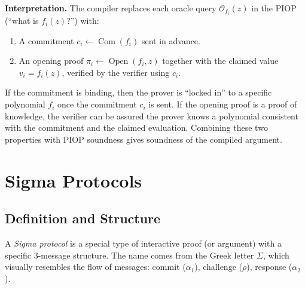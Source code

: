 \documentclass[11pt]{article}
\theoremstyle{plain}
\theoremstyle{definition}
\DeclareMathOperator{\Com}{Com}
\DeclareMathOperator{\Open}{Open}
\begin{document}
\medskip
\noindent\textbf{Interpretation.}  The compiler replaces each oracle query
$\mathcal{O}_{f_i}(z)$ in the PIOP (``what is $f_i(z)$?'') with:
\begin{enumerate}
  \item A commitment $c_i \leftarrow \Com(f_i)$ sent in advance.
  \item An opening proof $\pi_i \leftarrow \Open(f_i, z)$ together with the claimed value
    $v_i = f_i(z)$, verified by the verifier using $c_i$.
\end{enumerate}
If the commitment is binding, then the prover is ``locked in'' to a specific polynomial
$f_i$ once the commitment $c_i$ is sent.  If the opening proof is a proof of knowledge,
the verifier can be assured the prover knows a polynomial consistent with the commitment
and the claimed evaluation.  Combining these two properties with PIOP soundness gives
soundness of the compiled argument.

\section{Sigma Protocols}

\subsection{Definition and Structure}

A \emph{Sigma protocol} is a special type of interactive proof (or argument) with a
specific 3-message structure.  The name comes from the Greek letter $\Sigma$, which
visually resembles the flow of messages: commit ($\alpha_1$), challenge ($\rho$),
response ($\alpha_2$).

\begin{center}
\end{center}
\end{document}
